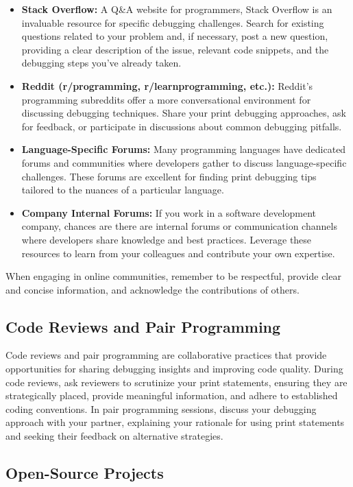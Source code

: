 \documentclass{article}
\begin{document}
{{{{\begin{itemize}
    \itemsep0em
    \item \textbf{Stack Overflow:} A Q\&A website for programmers, Stack Overflow is an invaluable resource for specific debugging challenges. Search for existing questions related to your problem and, if necessary, post a new question, providing a clear description of the issue, relevant code snippets, and the debugging steps you've already taken.
    \item \textbf{Reddit (r/programming, r/learnprogramming, etc.):} Reddit's programming subreddits offer a more conversational environment for discussing debugging techniques. Share your print debugging approaches, ask for feedback, or participate in discussions about common debugging pitfalls.
    \item \textbf{Language-Specific Forums:} Many programming languages have dedicated forums and communities where developers gather to discuss language-specific challenges. These forums are excellent for finding print debugging tips tailored to the nuances of a particular language.
    \item \textbf{Company Internal Forums:} If you work in a software development company, chances are there are internal forums or communication channels where developers share knowledge and best practices. Leverage these resources to learn from your colleagues and contribute your own expertise.
\end{itemize}

When engaging in online communities, remember to be respectful, provide clear and concise information, and acknowledge the contributions of others.

\subsection*{Code Reviews and Pair Programming}

Code reviews and pair programming are collaborative practices that provide opportunities for sharing debugging insights and improving code quality. During code reviews, ask reviewers to scrutinize your print statements, ensuring they are strategically placed, provide meaningful information, and adhere to established coding conventions. In pair programming sessions, discuss your debugging approach with your partner, explaining your rationale for using print statements and seeking their feedback on alternative strategies.

\subsection*{Open-Source Projects}

}}}}
\end{document}

